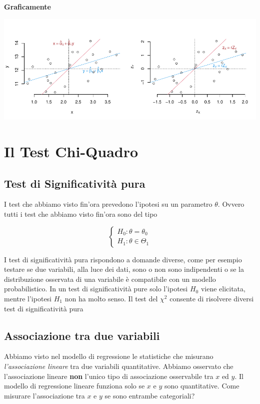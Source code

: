 \documentclass[
  11pt,
]{book}
\theoremstyle{mytheoremstyle}
\theoremstyle{mydefstyle}
\begin{document}
\textbf{Graficamente}

\begin{center}\includegraphics{Appunti_di_Statistica_2025_files/figure-latex/18-regressione-II-33-1} \end{center}

\chapter{Il Test Chi-Quadro}\label{il-test-chi-quadro}

\section{Test di Significatività pura}\label{test-di-significativituxe0-pura}

I test che abbiamo visto fin'ora prevedono l'ipotesi su un parametro
\(\theta\). Ovvero tutti i test che abbiamo visto fin'ora sono del tipo

\[
\begin{cases}
H_0:\theta=\theta_0\\
H_1:\theta\in\Theta_1
\end{cases}
\]

I test di significatività pura rispondono a domande diverse, come per esempio testare se
due variabili, alla luce dei dati, sono o non sono indipendenti o se la distribuzione osservata
di una variabile è compatibile con un modello probabilistico. In un test di
significatività pure solo l'ipotesi \(H_0\) viene elicitata, mentre l'ipotesi \(H_1\) non ha molto senso.
Il test del \(\chi^2\) consente di risolvere diversi test di significatività pura

\section{Associazione tra due variabili}\label{associazione-tra-due-variabili}

Abbiamo visto nel modello di regressione le statistiche che misurano
\emph{l'associazione lineare} tra due variabili quantitative.
Abbiamo osservato che l'associazione lineare \textbf{non} l'unico tipo di associazione
osservabile tra \(x\) ed \(y\).
Il modello di regressione lineare funziona solo se \(x\) e \(y\) sono quantitative.
Come misurare l'associazione tra \(x\) e \(y\) se sono entrambe categoriali?
\end{document}
